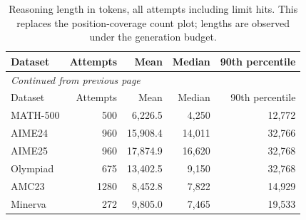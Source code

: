 \begingroup\scriptsize\setlength{\tabcolsep}{4pt}
\begin{longtable}{@{}lrrrr@{}}
\caption{Reasoning length in tokens, all attempts including limit hits. This replaces the position-coverage count plot; lengths are observed under the generation budget.}\label{tab:reasoning-length}\\
\toprule
Dataset & Attempts & Mean & Median & 90th percentile \\
\midrule\endfirsthead
\multicolumn{5}{l}{\textit{Continued from previous page}}\\
\toprule
Dataset & Attempts & Mean & Median & 90th percentile \\
\midrule\endhead
\bottomrule\endfoot
MATH-500 & 500 & 6,226.5 & 4,250 & 12,772 \\
AIME24 & 960 & 15,908.4 & 14,011 & 32,766 \\
AIME25 & 960 & 17,874.9 & 16,620 & 32,768 \\
Olympiad & 675 & 13,402.5 & 9,150 & 32,768 \\
AMC23 & 1280 & 8,452.8 & 7,822 & 14,929 \\
Minerva & 272 & 9,805.0 & 7,465 & 19,533 \\
\end{longtable}\endgroup
